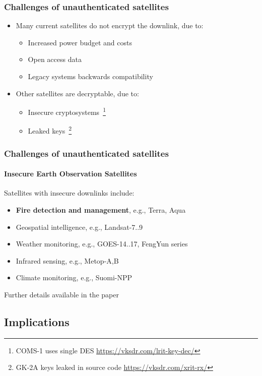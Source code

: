 \documentclass{beamer}
\begin{document}
\def\footnoterule{\only<6->\oldfootnoterule}
\begin{frame}
  \frametitle{Challenges of unauthenticated satellites}
  \begin{itemize}[<+->]
    \item Many current satellites do not encrypt the downlink, due to:
    \begin{itemize}[<+->]
      \item Increased power budget and costs
      \item Open access data
      \item Legacy systems backwards compatibility
    \end{itemize}
    
    \item Other satellites are decryptable, due to:
    \begin{itemize}[<+->]
      \item Insecure cryptosystems~\footnote<6->{COMS-1 uses single DES \url{https://vksdr.com/lrit-key-dec/}}
      \item Leaked keys~\footnote<7->{GK-2A keys leaked in source code \url{https://vksdr.com/xrit-rx/}}
    \end{itemize}
  \end{itemize}
\end{frame}

\begin{frame}
  \frametitle{Challenges of unauthenticated satellites}
  \framesubtitle{Insecure Earth Observation Satellites}

  Satellites with insecure downlinks include:

  \begin{itemize}
    \item \textbf{Fire detection and management}, e.g., Terra, Aqua
    \pause
    \item Geospatial intelligence, e.g., Landsat-7..9
    \item Weather monitoring, e.g., GOES-14..17, FengYun series
    \item Infrared sensing, e.g., Metop-A,B
    \item Climate monitoring, e.g., Suomi-NPP
  \end{itemize}

  \pause
  \newline
  Further details available in the paper
\end{frame}

\subsection{Implications}
\end{document}
